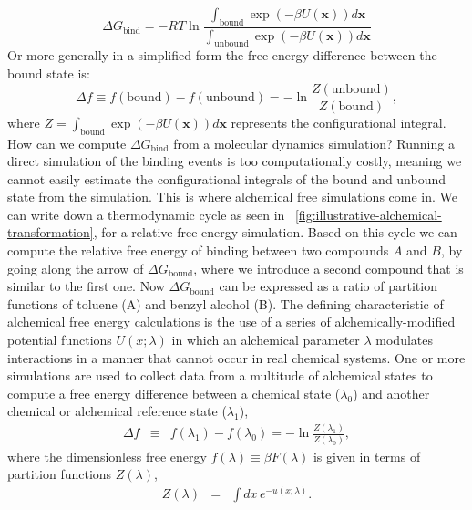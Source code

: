 \documentclass[9pt,bestpractices]{livecoms}
\begin{document}
\begin{equation}
    \Delta G_{\mathrm{bind}} = -RT\ln\frac{\int_\mathrm{bound} \exp(-\beta U(\mathbf{x}))d\mathbf{x}}{\int_\mathrm{unbound} \exp(-\beta U(\mathbf{x}))d\mathbf{x}}
\end{equation}
Or more generally in a simplified form the free energy difference between the bound state is:
\begin{equation}
\Delta f \equiv f(\mathrm{bound}) - f(\mathrm{unbound}) = -\ln\frac{Z(\mathrm{unbound})}{Z({\mathrm{bound}})},
\end{equation}
where $Z = \int_\mathrm{bound} \exp(-\beta U(\mathbf{x}))d\mathbf{x}$ represents the configurational integral. 
How can we compute $\Delta G_{\mathrm{bind}}$ from a molecular dynamics simulation? Running a direct simulation of the binding events is too computationally costly, meaning we cannot easily estimate the configurational integrals of the bound and unbound state from the simulation. This is where alchemical free simulations come in. We can write down a thermodynamic cycle as seen in ~\ref{fig:illustrative-alchemical-transformation}, for a relative free energy simulation. Based on this cycle we can compute the relative free energy of binding between two compounds $A$ and $B$, by going along the arrow of $\Delta G_{\mathrm{bound}}$, where we introduce a second compound that is similar to the first one. Now $\Delta G_{\mathrm{bound}}$ can be expressed as a ratio of partition functions of toluene (A) and benzyl alcohol (B). 
The defining characteristic of alchemical free energy calculations is the use of a series of alchemically-modified potential functions $U(x; \lambda)$ in which an alchemical parameter $\lambda$ modulates interactions in a manner that cannot occur in real chemical systems.
One or more simulations are used to collect data from a multitude of alchemical states to compute a free energy difference between a chemical state ($\lambda_0$) and another chemical or alchemical reference state ($\lambda_1$),
\begin{eqnarray}
\Delta f &\equiv& f(\lambda_1) - f(\lambda_0) = - \ln \frac{Z(\lambda_1)}{Z(\lambda_0)} , \label{equation:dimensionless-free-energy-difference}
\end{eqnarray}
where the dimensionless free energy $f(\lambda) \equiv \beta F(\lambda)$ is given in terms of partition functions $Z(\lambda)$,
\begin{eqnarray}
Z(\lambda) &=& \int dx \, e^{-u(x; \lambda)} .
\label{equation:partition-function-definition}
\end{eqnarray}
\end{document}

